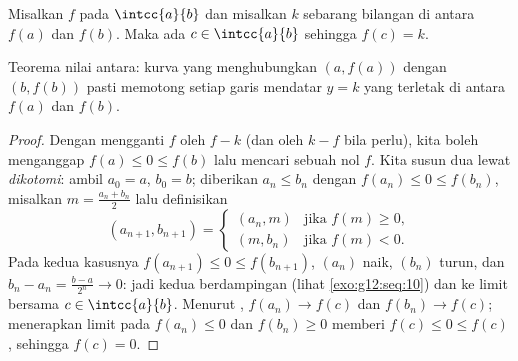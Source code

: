 \begin{theorem}\label{thm:g12:limcont:ivt}
Misalkan $f$  pada $\intcc{a}{b}$ dan misalkan $k$ sebarang bilangan di
antara $f(a)$ dan $f(b)$. Maka ada $c \in \intcc{a}{b}$ sehingga
$f(c) = k$.
\end{theorem}

\begin{omfigure}

{\small Teorema nilai antara: kurva  yang menghubungkan
$(a, f(a))$ dengan $(b, f(b))$ pasti memotong setiap garis mendatar
$y = k$ yang terletak di antara $f(a)$ dan $f(b)$.}
\end{omfigure}

\begin{proof}
Dengan mengganti $f$ oleh $f - k$ (dan oleh $k - f$ bila perlu), kita boleh
menganggap $f(a) \leq 0 \leq f(b)$ lalu mencari sebuah nol $f$. Kita susun dua
 lewat \emph{dikotomi}: ambil $a_0 = a$, $b_0 = b$;
diberikan $a_n \leq b_n$ dengan $f(a_n) \leq 0 \leq f(b_n)$, misalkan
$m = \frac{a_n + b_n}{2}$ lalu definisikan
\[
(a_{n+1}, b_{n+1}) =
\begin{cases}
(a_n, m) & \text{jika } f(m) \geq 0,\\
(m, b_n) & \text{jika } f(m) < 0.
\end{cases}
\]
Pada kedua kasusnya $f(a_{n+1}) \leq 0 \leq f(b_{n+1})$,  $(a_n)$
naik, $(b_n)$ turun, dan
$b_n - a_n = \frac{b-a}{2^n} \to 0$: jadi kedua  berdampingan (lihat
\cref{exo:g12:seq:10}) dan  ke limit bersama
$c \in \intcc{a}{b}$. Menurut , $f(a_n) \to f(c)$ dan
$f(b_n) \to f(c)$; menerapkan limit pada $f(a_n) \leq 0$ dan
$f(b_n) \geq 0$ memberi $f(c) \leq 0 \leq f(c)$, sehingga $f(c) = 0$.
\end{proof}

